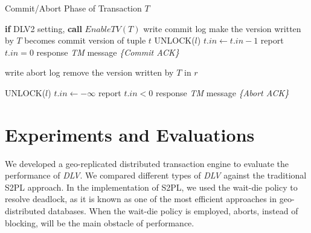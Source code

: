 \documentclass[conference]{IEEEtran}
\begin{document}
\begin{algorithm}[!h]
  \caption{Commit/Abort Phase of Transaction ${T}$}
  \begin{algorithmic}[1]
    \State \textbf{if} DLV2 setting, \textbf{call} ${EnableTV(T)}$ 
    \State write commit log
      \State make the version written by ${T}$ becomes commit version of tuple ${t}$ 
    \EndFor
      \State UNLOCK(${l}$)
    \EndFor
      \State ${t.in \gets t.in - 1}$ 
        \State report ${t.in = 0}$ 
      \EndIf
    \EndFor
    \State response \emph{TM} message \emph{\{Commit ACK\}}
    \label{func:commit}
  \EndFunction
  \end{algorithmic}
  \begin{algorithmic}[1]
  \State write abort log
    \State remove the version written by ${T}$ in ${r}$
\EndFor

      \State UNLOCK(${l}$)
    \EndFor
      \State ${t.in \gets -\infty }$
      \State report ${t.in < 0}$ 
    \EndFor
    \State response \emph{TM} message \emph{\{Abort ACK\}}
    \label{func:abort}
  \EndFunction
  \end{algorithmic}

  \label{alg:commit_phase}
\end{algorithm}

\section{Experiments and Evaluations}
\label{sec:experiments}

We developed a geo-replicated distributed transaction engine to evaluate the performance of \emph{DLV}.
We compared different types of \emph{DLV} against the traditional S2PL approach. %
In the implementation of S2PL, we used the wait-die policy to resolve deadlock, as it is known as one of the most efficient approaches in geo-distributed databases.
When the wait-die policy is employed, aborts, instead of blocking, will be the main obstacle of performance. 
\end{document}
